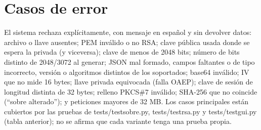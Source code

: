 \documentclass[11pt,a4paper]{article}
\newcommand{\cod}[1]{{\ttfamily\let\_\relax\def\_{\textunderscore\penalty0\hskip0pt\relax}\def\/{\slash\penalty0\hskip0pt\relax}#1}}
\begin{document}
\section{Casos de error}
El sistema rechaza explícitamente, con mensaje en español y sin devolver datos: archivo o llave ausentes; PEM
inválido o no RSA; clave pública usada donde se espera la privada (y viceversa); clave de menos de 2048 bits;
número de bits distinto de 2048/3072 al generar; JSON mal formado, campos faltantes o de tipo incorrecto,
versión o algoritmos distintos de los soportados; base64 inválido; IV que no mide 16 bytes; llave privada
equivocada (falla OAEP); clave de sesión de longitud distinta de 32 bytes; relleno PKCS\#7 inválido; SHA-256 que
no coincide (``sobre alterado''); y peticiones mayores de 32 MB. Los casos principales están cubiertos por las pruebas de \cod{tests/test\_sobre.py}, \cod{tests/test\_rsa.py}
y \cod{tests/test\_gui.py} (tabla anterior); no se afirma que cada variante tenga una prueba propia.
\end{document}
